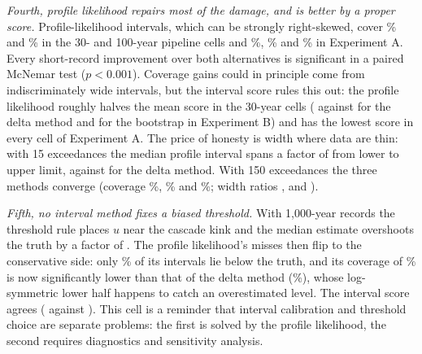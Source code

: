 \emph{Fourth, profile likelihood repairs most of the damage, and is better by a proper score.} Profile-likelihood intervals, which can be strongly right-skewed, cover \covBThirtyProfileK\% and \covBHundredProfileK\% in the 30- and 100-year pipeline cells and \covAThirtyProfileK\%, \covAHundredProfileK\% and \covAThreeHundredProfileK\% in Experiment A. Every short-record improvement over both alternatives is significant in a paired McNemar test ($p<0.001$). Coverage gains could in principle come from indiscriminately wide intervals, but the interval score rules this out: the profile likelihood roughly halves the mean score in the 30-year cells (\scoreBThirtyProfileK{} against \scoreBThirtyDeltaK{} for the delta method and \scoreBThirtyBootstrapK{} for the bootstrap in Experiment B) and has the lowest score in every cell of Experiment A. The price of honesty is width where data are thin: with 15 exceedances the median profile interval spans a factor of \ratioAThirtyProfileK{} from lower to upper limit, against \ratioAThirtyDeltaK{} for the delta method. With 150 exceedances the three methods converge (coverage \covAThreeHundredDeltaK\%, \covAThreeHundredBootstrapK\% and \covAThreeHundredProfileK\%; width ratios \ratioAThreeHundredDeltaK, \ratioAThreeHundredBootstrapK{} and \ratioAThreeHundredProfileK).

\emph{Fifth, no interval method fixes a biased threshold.} With 1,000-year records the threshold rule places $u$ near the cascade kink and the median estimate overshoots the truth by a factor of \medRatioBThousandK{}. The profile likelihood's misses then flip to the conservative side: only \belowBThousandProfileK\% of its intervals lie below the truth, and its coverage of \covBThousandProfileK\% is now significantly lower than that of the delta method (\covBThousandDeltaK\%), whose log-symmetric lower half happens to catch an overestimated level. The interval score agrees (\scoreBThousandProfileK{} against \scoreBThousandDeltaK{}). This cell is a reminder that interval calibration and threshold choice are separate problems: the first is solved by the profile likelihood, the second requires diagnostics and sensitivity analysis.

